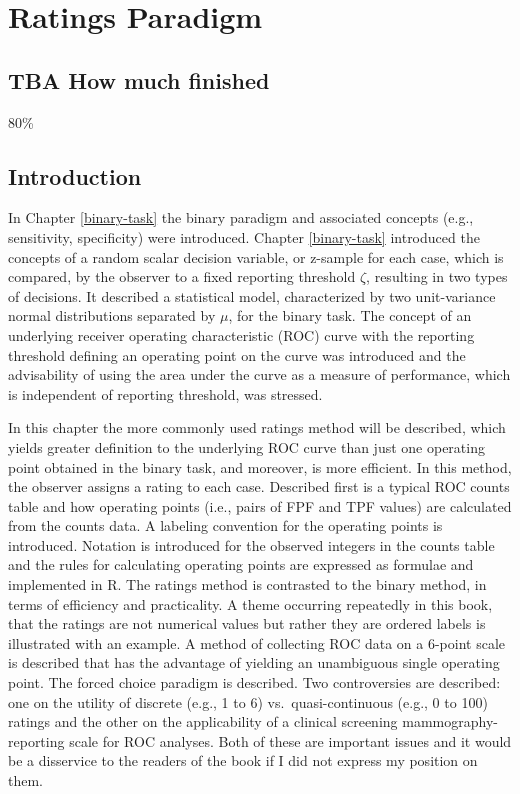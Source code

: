 \documentclass[
]{book}
\begin{document}
\hypertarget{ratings-paradigm}{%
\chapter{Ratings Paradigm}\label{ratings-paradigm}}

\hypertarget{ratings-paradigm-how-much-finished}{%
\section{TBA How much finished}\label{ratings-paradigm-how-much-finished}}

80\%

\hypertarget{ratings-paradigm-introduction}{%
\section{Introduction}\label{ratings-paradigm-introduction}}

In Chapter \ref{binary-task} the binary paradigm and associated concepts (e.g., sensitivity, specificity) were introduced. Chapter \ref{binary-task} introduced the concepts of a random scalar decision variable, or z-sample for each case, which is compared, by the observer to a fixed reporting threshold \(\zeta\), resulting in two types of decisions. It described a statistical model, characterized by two unit-variance normal distributions separated by \(\mu\), for the binary task. The concept of an underlying receiver operating characteristic (ROC) curve with the reporting threshold defining an operating point on the curve was introduced and the advisability of using the area under the curve as a measure of performance, which is independent of reporting threshold, was stressed.

In this chapter the more commonly used ratings method will be described, which yields greater definition to the underlying ROC curve than just one operating point obtained in the binary task, and moreover, is more efficient. In this method, the observer assigns a rating to each case. Described first is a typical ROC counts table and how operating points (i.e., pairs of FPF and TPF values) are calculated from the counts data. A labeling convention for the operating points is introduced. Notation is introduced for the observed integers in the counts table and the rules for calculating operating points are expressed as formulae and implemented in R. The ratings method is contrasted to the binary method, in terms of efficiency and practicality. A theme occurring repeatedly in this book, that the ratings are not numerical values but rather they are ordered labels is illustrated with an example. A method of collecting ROC data on a 6-point scale is described that has the advantage of yielding an unambiguous single operating point. The forced choice paradigm is described. Two controversies are described: one on the utility of discrete (e.g., 1 to 6) vs.~quasi-continuous (e.g., 0 to 100) ratings and the other on the applicability of a clinical screening mammography-reporting scale for ROC analyses. Both of these are important issues and it would be a disservice to the readers of the book if I did not express my position on them.
\end{document}

